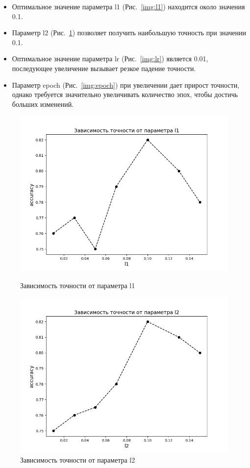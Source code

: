 \documentclass[14pt]{matmex-diploma-custom}
\begin{document}
\begin{itemize}
\item Оптимальное значение параметра l1 (Рис.~\ref{img:l1}) находится около значения 0.1.
\item Параметр l2 (Рис.~\ref{img:l2}) позволяет получить наибольшую точность при значении 0.1.
\item Оптимальное значение параметра lr (Рис.~\ref{img:lr}) является 0.01, последующее увеличение вызывает резкое падение точности.
\item Параметр epoch (Рис.~\ref{img:epoch}) при увеличении дает прирост точности, однако требуется значительно увеличивать количество эпох, чтобы достичь больших изменений.
\end{itemize}

\begin{figure}[!htb]
\includegraphics[width=\linewidth]{img/l1}
\caption{Зависимость точности от параметра l1}
\label{img:l1}
\endminipage
\hfill
{}
\includegraphics[width=\linewidth]{img/l2}
\caption{Зависимость точности от параметра l2}
\label{img:l2}
\endminipage
\end{figure}
\end{document}
